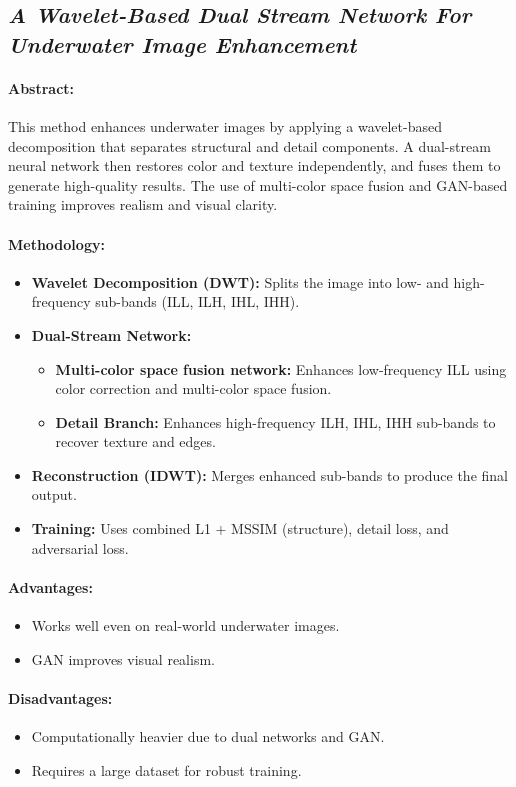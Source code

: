 \subsection{\textit{A Wavelet-Based Dual
        Stream Network For Underwater Image Enhancement\cite{Ma_2022}}}

\paragraph{Abstract:}
This method enhances underwater images by applying a wavelet-based decomposition that separates structural and detail components. A dual-stream neural network then restores color and texture independently, and fuses them to generate high-quality results. The use of multi-color space fusion and GAN-based training improves realism and visual clarity.

\paragraph{Methodology:}
\begin{itemize}
    \item  \textbf{Wavelet Decomposition (DWT):} Splits the image into low- and high-frequency sub-bands (ILL, ILH, IHL, IHH).
    \item \textbf{Dual-Stream Network:}
          \begin{itemize}
              \item \textbf{Multi-color space fusion network:}  Enhances low-frequency ILL using color correction and multi-color space fusion.
              \item \textbf{Detail Branch:} Enhances high-frequency ILH, IHL, IHH sub-bands to recover texture and edges.
          \end{itemize}
    \item \textbf{Reconstruction (IDWT):} Merges enhanced sub-bands to produce the final output.
    \item \textbf{Training:} Uses combined L1 + MSSIM (structure), detail loss, and adversarial loss.
\end{itemize}

\paragraph{Advantages:}
\begin{itemize}
    \item Works well even on real-world underwater images.
    \item GAN improves visual realism.

\end{itemize}

\paragraph{Disadvantages:}
\begin{itemize}
    \item Computationally heavier due to dual networks and GAN.
    \item Requires a large dataset for robust training.
\end{itemize}